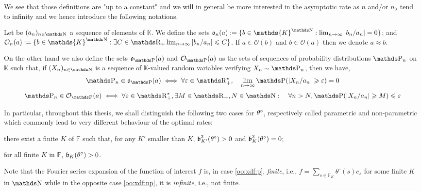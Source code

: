 We see that those definitions are "up to a constant" and we will in general be more interested in the asymptotic rate as $n$ and/or $n_{\lambda}$ tend to infinity and we hence introduce the following notations.

\begin{nota}
Let be $(a_{n})_{n \in \N}$ a sequence of elements of $\mathds{K}$.
We define the sets $\mathfrak{o}_{n}(a) := \{b \in \mathds{K}^{\N}: \lim_{n \rightarrow \infty}\vert b_{n}/a_{n} \vert = 0\}$; and $\mathcal{O}_{n}(a) := \{b \in \mathds{K}^{\N}: \exists C \in \R_{+} \lim_{n \rightarrow \infty}\vert b_{n}/a_{n} \vert \leq C\}$.
If $a \in \mathcal{O}(b)$ and $b \in \mathcal{O}(a)$ then we denote $a \approx b$.

On the other hand we also define the sets $\mathfrak{o}_{\P}(a)$ and $\mathcal{O}_{\P}(a)$ as the sets of sequences of probability distributions $\P_{n}$ on $\mathds{K}$ such that, if $(X_{n})_{n \in \N}$ is a sequence of $\mathds{K}$-valued random variables verifying $X_{n} \sim \P_{n}$, then we have,
\[ \P_{n} \in \mathfrak{o}_{\P}(a) \iff \forall \epsilon \in \R_{+}^{\star}, \quad \lim_{n \rightarrow \infty} \P(\vert X_{n} / a_{n} \vert \geq \epsilon) = 0\]
\[ \P_{n} \in \mathcal{O}_{\P}(a) \iff \forall \epsilon \in \R_{+}^{\star}, \exists M \in \R_{+}, N \in \N: \quad \forall n > N, \P(\vert X_{n} / a_{n} \vert \geq M) \leq \epsilon\]
\assEnd
\end{nota}

In particular, throughout this thesis, we shall distinguish the following two cases for $\theta^{\circ}$, respectively called parametric and non-parametric which commonly lead to very different behaviour of the optimal rates:
\begin{Liste}[]
\item[\mylabel{oo:xdf:p}{\dgrau\bfseries{(p)}}] there exist a finite $K$ of $\mathds{F}$ such that, for any $K'$ smaller than $K$, $\operatorname{\mathfrak{b}}_{K'}^{2}(\theta^{\circ}) > 0$ and $\operatorname{\mathfrak{b}}_{K}^{2}(\theta^{\circ}) = 0$;
\item[\mylabel{oo:xdf:np}{\dgrau\bfseries{(np)}}] for all finite $K$ in $\mathds{F}$, $\operatorname{\mathfrak{b}}_{K}(\theta^{\circ})>0$.
\end{Liste}

Note that the Fourier series expansion of the function of interest $f$ is, in case \ref{oo:xdf:p}, \textit{finite}, i.e., $f=\sum_{s \in \mathds{F}_{K}}\theta^{\circ}(s)e_{s}$ for some finite $K$ in $\N$ while in the opposite case
\ref{oo:xdf:np}, it is \textit{infinite}, i.e., not finite.

